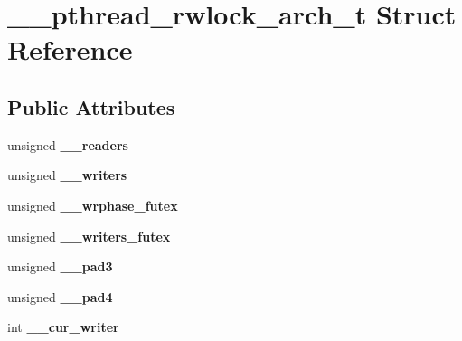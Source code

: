 \hypertarget{struct____pthread__rwlock__arch__t}{}\section{\+\_\+\+\_\+pthread\+\_\+rwlock\+\_\+arch\+\_\+t Struct Reference}
\label{struct____pthread__rwlock__arch__t}
\subsection*{Public Attributes}
\begin{DoxyCompactItemize}
\item 
unsigned {\bfseries \+\_\+\+\_\+readers}\hypertarget{struct____pthread__rwlock__arch__t_a4bca29520cd7a78fcd9a4255d541d232}{}\label{struct____pthread__rwlock__arch__t_a4bca29520cd7a78fcd9a4255d541d232}

\item 
unsigned {\bfseries \+\_\+\+\_\+writers}\hypertarget{struct____pthread__rwlock__arch__t_ab8a8b675bf3fd067d26e0e59f6fea474}{}\label{struct____pthread__rwlock__arch__t_ab8a8b675bf3fd067d26e0e59f6fea474}

\item 
unsigned {\bfseries \+\_\+\+\_\+wrphase\+\_\+futex}\hypertarget{struct____pthread__rwlock__arch__t_a348fdb6e0bd370f3cc873faf23e72ebe}{}\label{struct____pthread__rwlock__arch__t_a348fdb6e0bd370f3cc873faf23e72ebe}

\item 
unsigned {\bfseries \+\_\+\+\_\+writers\+\_\+futex}\hypertarget{struct____pthread__rwlock__arch__t_a3658fde9da1134538d99f6cc410046d0}{}\label{struct____pthread__rwlock__arch__t_a3658fde9da1134538d99f6cc410046d0}

\item 
unsigned {\bfseries \+\_\+\+\_\+pad3}\hypertarget{struct____pthread__rwlock__arch__t_ac730a9fe7f4729e20de21c52d07189cb}{}\label{struct____pthread__rwlock__arch__t_ac730a9fe7f4729e20de21c52d07189cb}

\item 
unsigned {\bfseries \+\_\+\+\_\+pad4}\hypertarget{struct____pthread__rwlock__arch__t_a24d61b529b8a9b56b98f2d825929746b}{}\label{struct____pthread__rwlock__arch__t_a24d61b529b8a9b56b98f2d825929746b}

\item 
int {\bfseries \+\_\+\+\_\+cur\+\_\+writer}\hypertarget{struct____pthread__rwlock__arch__t_a57a4a0f23e2f2f990eac6d50c0994178}{}\label{struct____pthread__rwlock__arch__t_a57a4a0f23e2f2f990eac6d50c0994178}


\end{DoxyCompactItemize}
